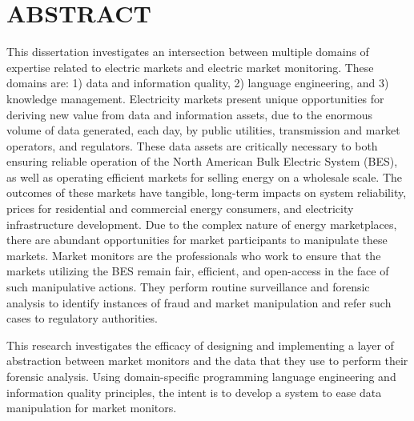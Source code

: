 %
%
%
%  
%

\chapter*{ABSTRACT}

\pagestyle{plain} %
\setcounter{page}{2}

\indent This dissertation investigates an intersection between multiple domains of expertise related to electric markets and electric market monitoring. These domains are: 1) data and information quality, 2) language engineering, and 3) knowledge management. Electricity markets present unique opportunities for deriving new value from data and information assets, due to the enormous volume of data generated, each day, by public utilities, transmission and market operators, and regulators. These data assets are critically necessary to both ensuring reliable operation of the North American Bulk Electric System (BES), as well as operating efficient markets for selling energy on a wholesale scale. The outcomes of these markets have tangible, long-term impacts on system reliability, prices for residential and commercial energy consumers, and electricity infrastructure development. 
Due to the complex nature of energy marketplaces, there are abundant opportunities for market participants to manipulate these markets. Market monitors are the professionals who work to ensure that the markets utilizing the BES remain fair, efficient, and open-access in the face of such manipulative actions. They perform routine surveillance and forensic analysis to identify instances of fraud and market manipulation and refer such cases to regulatory authorities. 

This research investigates the efficacy of designing and implementing a layer of abstraction between market monitors and the data that they use to perform their forensic analysis. Using domain-specific programming language engineering and information quality principles, the intent is to develop a system to ease data manipulation for market monitors.

\pagebreak{}
